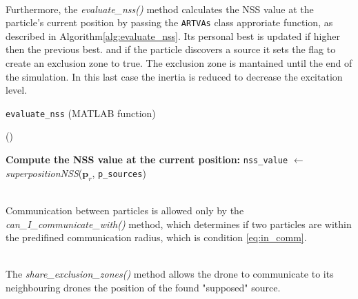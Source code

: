 \noindent\\
Furthermore, the \textit{evaluate\_nss()} method calculates the 
NSS value at the particle's current position by passing the 
\texttt{ARTVAs} class approriate function, as described 
in Algorithm\ref{alg:evaluate_nss}.
Its personal best is updated if higher then the previous best. 
and if the particle discovers a source  
it sets the flag to create an exclusion zone to true.
The exclusion zone is mantained until the end 
of the simulation. 
In this last case the inertia is reduced to decrease 
the excitation level.
\begin{algorithm}[h]
     \caption{\texttt{evaluate\_nss} (MATLAB function)}\label{alg:evaluate_nss}
     \vspace{0.3\baselineskip}
     \nonl \Fn(\tcc*[h]{}){}{
        \SetAlgoBlockMarkers{}{}
        \DontPrintSemicolon \nonl \textbf{Compute the NSS value at the current position:}\;\PrintSemicolon
        \texttt{nss\_value} $\gets$ \textit{superpositionNSS}($\mathbf{p}_r$, \texttt{p\_sources})\;

     }
 \end{algorithm}

\noindent\\
Communication between particles is allowed only by the 
\textit{can\_I\_communicate\_with()} method, which 
determines if two particles are within the predifined 
communication radius, which is condition \ref{eq:in_comm}.

\noindent\\
The \textit{share\_exclusion\_zones()} 
method allows the drone to communicate to its 
neighbouring drones the position 
of the found "supposed" source.

